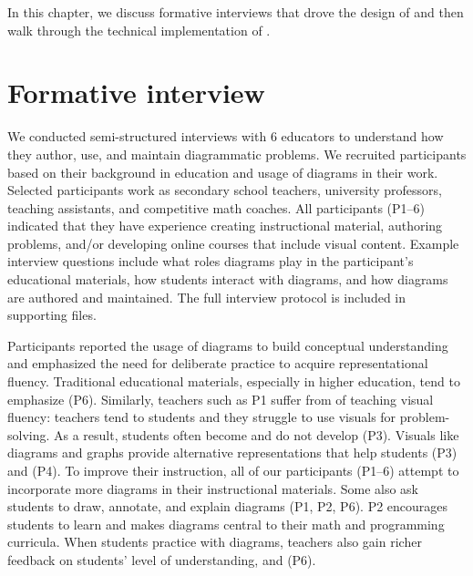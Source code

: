 In this chapter, we discuss formative interviews that drove the design of \Edgeworth{} and then walk through the technical implementation of \Edgeworth.

\section{Formative interview}

\label{sec:edgeworth-formative}

We conducted semi-structured interviews with 6 educators to understand how they author, use, and maintain diagrammatic problems. We recruited participants based on their background in education and usage of diagrams in their work. Selected participants work as secondary school teachers, university professors, teaching assistants, and competitive math coaches. All participants (P1--6) indicated that they have experience creating instructional material, authoring problems, and/or developing online courses that include visual content. Example interview questions include what roles diagrams play in the participant's educational materials, how students interact with diagrams, and how diagrams are authored and maintained. The full interview protocol is included in supporting files.

Participants reported the usage of diagrams to build conceptual understanding and emphasized the need for deliberate practice to acquire representational fluency. Traditional educational materials, especially in higher education, tend to emphasize  (P6).  Similarly, teachers such as P1 suffer from  of teaching visual fluency: teachers tend to  students and they struggle to use visuals for problem-solving.  As a result, students often become  and do not develop  (P3). Visuals like diagrams and graphs provide alternative representations that help students  (P3) and  (P4). To improve their instruction, all of our participants (P1--6) attempt to incorporate more diagrams in their instructional materials. Some also ask students to draw, annotate, and explain diagrams (P1, P2, P6). P2 encourages students to learn  and makes diagrams central to their math and programming curricula. When students practice with diagrams, teachers also gain richer feedback on students' level of understanding, and  (P6).

